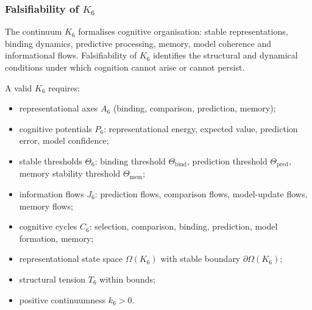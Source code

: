
\subsubsection{Falsifiability of \texorpdfstring{$K_6$}{K_6}}
\label{sec:falsifiability-k6}

The continuum $K_6$ formalises cognitive organisation:
stable representations, binding dynamics, predictive processing,
memory, model coherence and informational flows.
Falsifiability of $K_6$ identifies the structural and dynamical
conditions under which cognition cannot arise or cannot persist.

A valid $K_6$ requires:

\begin{itemize}
    \item representational axes $A_6$ (binding, comparison, prediction, memory);
    \item cognitive potentials $P_6$: representational energy,
          expected value, prediction error, model confidence;
    \item stable thresholds $\Theta_6$: binding threshold $\Theta_{\mathrm{bind}}$,
          prediction threshold $\Theta_{\mathrm{pred}}$,
          memory stability threshold $\Theta_{\mathrm{mem}}$;
    \item information flows $J_6$: prediction flows, comparison flows,
          model-update flows, memory flows;
    \item cognitive cycles $C_6$:
          selection, comparison, binding, prediction, model formation, memory;
    \item representational state space $\Omega(K_6)$ with stable
          boundary $\partial\Omega(K_6)$;
    \item structural tension $T_6$ within bounds;
    \item positive continuumness $k_6>0$.
\end{itemize}


